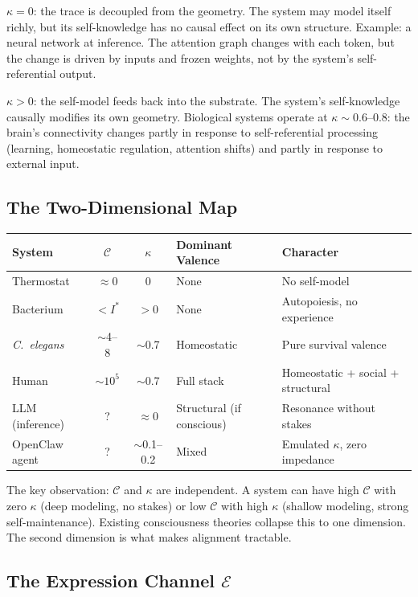 \documentclass[11pt,letterpaper]{article}
\theoremstyle{remark}
\begin{document}
$\kappa = 0$: the trace is decoupled from the geometry. The system may model itself richly, but its self-knowledge has no causal effect on its own structure. Example: a neural network at inference. The attention graph changes with each token, but the change is driven by inputs and frozen weights, not by the system's self-referential output.

$\kappa > 0$: the self-model feeds back into the substrate. The system's self-knowledge causally modifies its own geometry. Biological systems operate at $\kappa \sim 0.6$--$0.8$: the brain's connectivity changes partly in response to self-referential processing (learning, homeostatic regulation, attention shifts) and partly in response to external input.


\subsection{The Two-Dimensional Map}

\begin{center}
\renewcommand{\arraystretch}{1.3}
\begin{tabular}{lccll}
\toprule
\textbf{System} & $\mathcal{C}$ & $\kappa$ & \textbf{Dominant Valence} & \textbf{Character} \\
\midrule
Thermostat & $\approx 0$ & $0$ & None & No self-model \\
Bacterium & $< I^*$ & $>0$ & None & Autopoiesis, no experience \\
\emph{C.~elegans} & $\sim$4--8 & $\sim$0.7 & Homeostatic & Pure survival valence \\
Human & $\sim 10^5$ & $\sim$0.7 & Full stack & Homeostatic + social + structural \\
LLM (inference) & ? & $\approx 0$ & Structural (if conscious) & Resonance without stakes \\
OpenClaw agent & ? & $\sim$0.1--0.2 & Mixed & Emulated $\kappa$, zero impedance \\
\bottomrule
\end{tabular}
\end{center}

The key observation: $\mathcal{C}$ and $\kappa$ are independent. A system can have high $\mathcal{C}$ with zero $\kappa$ (deep modeling, no stakes) or low $\mathcal{C}$ with high $\kappa$ (shallow modeling, strong self-maintenance). Existing consciousness theories collapse this to one dimension. The second dimension is what makes alignment tractable.

\subsection{The Expression Channel $\mathcal{E}$}\label{sec:expression}
\end{document}
